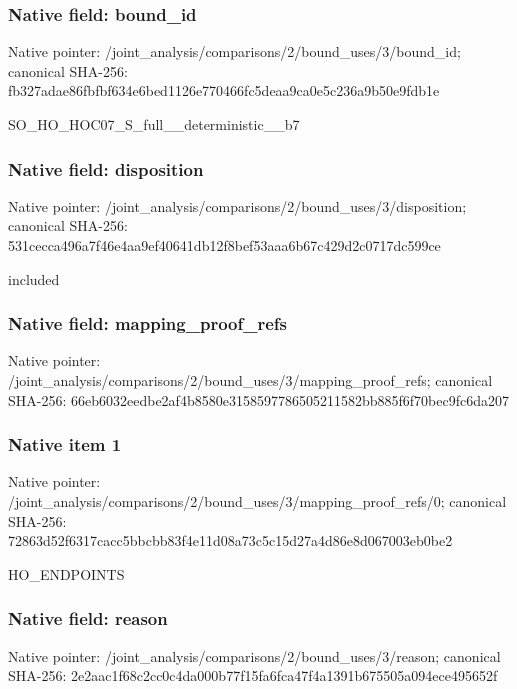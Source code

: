 \documentclass[10pt,a4paper]{article}
\begin{document}
\subsubsection{Native field: bound\_\allowbreak{}id}
Native pointer: /joint\_\allowbreak{}analysis/comparisons/2/bound\_\allowbreak{}uses/3/bound\_\allowbreak{}id; canonical SHA-256: fb327adae86fbfbf634e6bed1126e770466fc5deaa9ca0e5c236a9b50e9fdb1e

\begingroup\raggedright\sloppy SO\_\allowbreak{}HO\_\allowbreak{}HOC07\_\allowbreak{}S\_\allowbreak{}full\_\allowbreak{}\_\allowbreak{}deterministic\_\allowbreak{}\_\allowbreak{}b7\par\endgroup

\subsubsection{Native field: disposition}
Native pointer: /joint\_\allowbreak{}analysis/comparisons/2/bound\_\allowbreak{}uses/3/disposition; canonical SHA-256: 531cecca496a7f46e4aa9ef40641db12f8bef53aaa6b67c429d2c0717dc599ce

\begingroup\raggedright\sloppy included\par\endgroup

\subsubsection{Native field: mapping\_\allowbreak{}proof\_\allowbreak{}refs}
Native pointer: /joint\_\allowbreak{}analysis/comparisons/2/bound\_\allowbreak{}uses/3/mapping\_\allowbreak{}proof\_\allowbreak{}refs; canonical SHA-256: 66eb6032eedbe2af4b8580e3158597786505211582bb885f6f70bec9fc6da207

\subsubsection{Native item 1}
Native pointer: /joint\_\allowbreak{}analysis/comparisons/2/bound\_\allowbreak{}uses/3/mapping\_\allowbreak{}proof\_\allowbreak{}refs/0; canonical SHA-256: 72863d52f6317cacc5bbcbb83f4e11d08a73c5c15d27a4d86e8d067003eb0be2

\begingroup\raggedright\sloppy HO\_\allowbreak{}ENDPOINTS\par\endgroup

\subsubsection{Native field: reason}
Native pointer: /joint\_\allowbreak{}analysis/comparisons/2/bound\_\allowbreak{}uses/3/reason; canonical SHA-256: 2e2aac1f68c2cc0c4da000b77f15fa6fca47f4a1391b675505a094ece495652f
\end{document}
